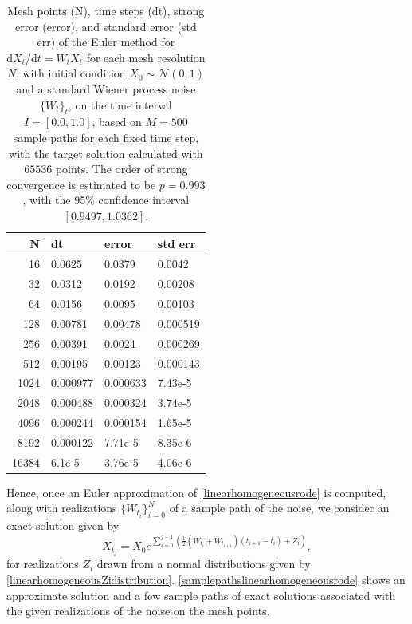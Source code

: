 \documentclass[reqno,12pt]{amsart}
\theoremstyle{plain} %
\theoremstyle{definition} %
\begin{document}
\begin{table}
    \begin{tabular}[htb]{|r|l|l|l|}
        \hline N & dt & error & std err \\
        \hline \hline
        16 & 0.0625 & 0.0379 & 0.0042 \\
        32 & 0.0312 & 0.0192 & 0.00208 \\
        64 & 0.0156 & 0.0095 & 0.00103 \\
        128 & 0.00781 & 0.00478 & 0.000519 \\
        256 & 0.00391 & 0.0024 & 0.000269 \\
        512 & 0.00195 & 0.00123 & 0.000143 \\
        1024 & 0.000977 & 0.000633 & 7.43e-5 \\
        2048 & 0.000488 & 0.000324 & 3.74e-5 \\
        4096 & 0.000244 & 0.000154 & 1.65e-5 \\
        8192 & 0.000122 & 7.71e-5 & 8.35e-6 \\
        16384 & 6.1e-5 & 3.76e-5 & 4.06e-6 \\
        \hline
    \end{tabular}
    \bigskip

    \caption{Mesh points (N), time steps (dt), strong error (error), and standard error (std err) of the Euler method for $\mathrm{d}X_t/\mathrm{d}t = W_t X_t$ for each mesh resolution $N$, with initial condition $X_0 \sim \mathcal{N}(0, 1)$ and a standard Wiener process noise $\{W_t\}_t$, on the time interval $I = [0.0, 1.0]$, based on $M = 500$ sample paths for each fixed time step, with the target solution calculated with $65536$ points. The order of strong convergence is estimated to be $p = 0.993$, with the 95\% confidence interval $[0.9497, 1.0362]$.}
    \label{tablinearhomogeneousrode}
\end{table}

Hence, once an Euler approximation of \eqref{linearhomogeneousrode} is computed, along with realizations $\{W_{t_i}\}_{i=0}^N$ of a sample path of the noise, we consider an exact solution given by
\begin{equation}
    \label{Xtlinearhomogeneousrode}
    X_{t_j} = X_0 e^{\sum_{i = 0}^{j-1}\left(\frac{1}{2}\left(W_{t_i} + W_{t_{i+1}}\right)(t_{i+1} - t_i) + Z_i\right)},
\end{equation}
for realizations $Z_i$ drawn from a normal distributions given by \eqref{linearhomogeneousZidistribution}. \cref{samplepathslinearhomogeneousrode} shows an approximate solution and a few sample paths of exact solutions associated with the given realizations of the noise on the mesh points.
\end{document}
